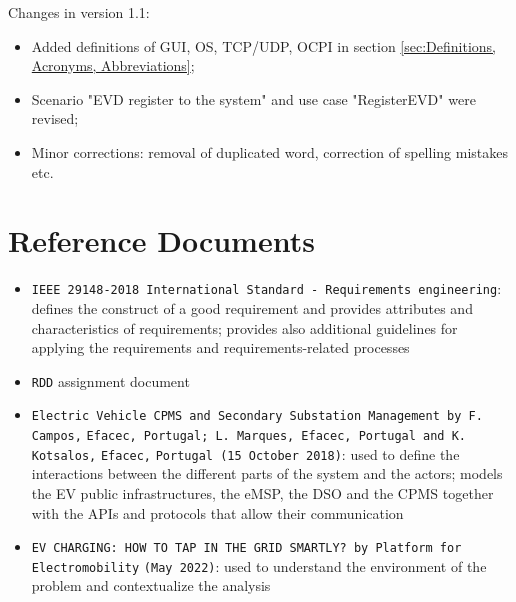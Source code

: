 Changes in version 1.1:
\begin{itemize}
    \item Added definitions of GUI, OS, TCP/UDP, OCPI in section \ref{sec:Definitions, Acronyms, Abbreviations};
    \item Scenario "EVD register to the system" and use case "RegisterEVD" were revised;
    \item Minor corrections: removal of duplicated word, correction of spelling mistakes etc. 
\end{itemize}
\section{Reference Documents}
\label{sec:Reference Documents}%
\begin{itemize}
    \item \verb|IEEE 29148-2018 International Standard - Requirements engineering|: defines the construct of a good requirement and provides attributes and characteristics of requirements; provides also additional guidelines for applying the requirements and requirements-related processes
    \item \verb|RDD| assignment document
    \item \verb|Electric Vehicle CPMS and Secondary Substation Management by F. Campos,| \verb|Efacec, Portugal; L. Marques, Efacec, Portugal and K. Kotsalos,| \verb|Efacec,| \verb|Portugal (15 October 2018)|: used to define the interactions between the different parts of the system and the actors; models the EV public infrastructures, the eMSP, the DSO and the CPMS together with the APIs and protocols that allow their communication
    \item \verb|EV CHARGING: HOW TO TAP IN THE GRID SMARTLY? by Platform |\verb|for|\\\verb|Electromobility| \verb|(May 2022)|: used to understand the environment of the problem and contextualize the analysis
\end{itemize}

